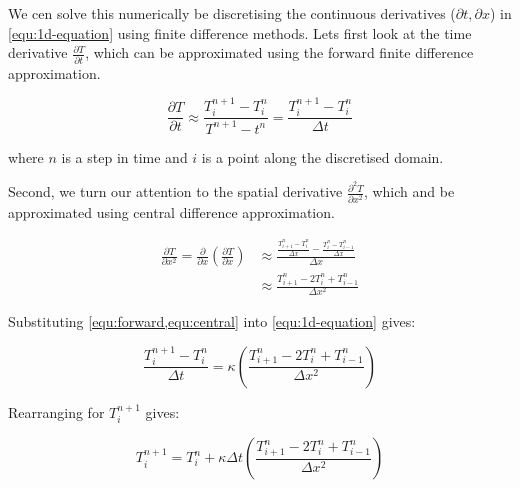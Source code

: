 \documentclass[a4page, twocolumn, twoside, 11pt]{article}
\begin{document}
We cen solve this numerically be discretising the continuous derivatives ($\partial t, \partial x$) in \cref{equ:1d-equation} using finite difference methods. Lets first look at the time derivative $\frac{\partial T}{\partial t}$, which can be approximated using the forward finite difference approximation.

\begin{equation}
  \frac{\partial T}{\partial t} \approx \frac{ T^{n+1}_{i}-T^{n}_{i} }{ T^{n+1}-t^{n} } = \frac{ T^{n+1}_{i}-T^{n}_{i} }{ \Delta t }
  \label{equ:forward}
\end{equation}

\noindent where $n$ is a step in time and $i$ is a point along the discretised domain.

Second, we turn our attention to the spatial derivative $\frac{\partial^2 T}{\partial x^2}$, which and be approximated using central difference approximation.

\begin{equation}
  \begin{split}
    \frac{\partial T}{\partial x^2} = \frac{\partial}{\partial x}\left(\frac{\partial T}{\partial x}\right) & \approx \frac{ \frac{ T^{n}_{i+1}-T^{n}_{i} }{ \Delta x } - \frac{ T^{n}_{i}-T^{n}_{i-1} }{ \Delta x } }{\Delta x} \\ & \approx \frac{T^n_{i+1}-2T^n_i+T^n_{i-1}}{\Delta x^2}
  \end{split}
  \label{equ:central}
\end{equation}

Substituting \cref{equ:forward,equ:central} into \cref{equ:1d-equation} gives:

\begin{equation}
  \frac{T^{n+1}_{i}-T^{n}_{i}}{\Delta t} = \kappa \left(\frac{T^n_{i+1}-2T^n_i+T^n_{i-1}}{\Delta x^2}\right)
\end{equation}

Rearranging for $T^{n+1}_{i}$ gives:

\begin{equation}
  T^{n+1}_{i} = T^{n}_{i} + \kappa\Delta t \left(\frac{T^n_{i+1}-2T^n_i+T^n_{i-1}}{\Delta x^2}\right)
\end{equation}
\end{document}
